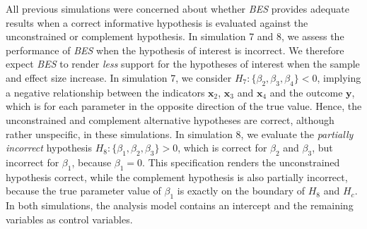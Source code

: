 \documentclass[
]{interact}
\begin{document}
                    All previous simulations were concerned about whether \emph{BES}
                    provides adequate results when a correct informative hypothesis is
                    evaluated against the unconstrained or complement hypothesis. In
                    simulation 7 and 8, we assess the performance of \emph{BES} when the
                    hypothesis of interest is incorrect. We therefore expect \emph{BES} to
                    render \emph{less} support for the hypotheses of interest when the
                    sample and effect size increase. In simulation 7, we consider
                    \(H_7: \{\beta_2, \beta_3, \beta_4\} < 0\), implying a negative
                    relationship between the indicators \(\boldsymbol{x}_2\),
                    \(\boldsymbol{x}_3\) and \(\boldsymbol{x}_4\) and the outcome
                    \(\boldsymbol{y}\), which is for each parameter in the opposite
                    direction of the true value. Hence, the unconstrained and complement
                    alternative hypotheses are correct, although rather unspecific, in these
                    simulations. In simulation 8, we evaluate the \emph{partially incorrect}
                    hypothesis \(H_8: \{\beta_1, \beta_2, \beta_3\} > 0\), which is correct
                    for \(\beta_2\) and \(\beta_3\), but incorrect for \(\beta_1\), because
                    \(\beta_1 = 0\). This specification renders the unconstrained hypothesis
                    correct, while the complement hypothesis is also partially incorrect,
                    because the true parameter value of \(\beta_1\) is exactly on the
                    boundary of \(H_8\) and \(H_c\). In both simulations, the analysis model
                    contains an intercept and the remaining variables as control variables.
                    
\end{document}
